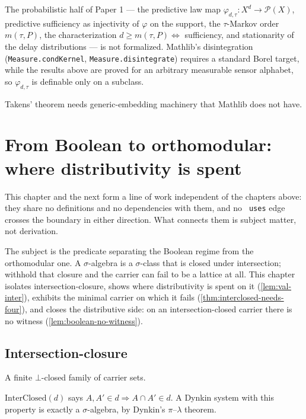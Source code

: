 The probabilistic half of Paper 1 --- the predictive law map
$\varphi_{d,\tau} : X^d \to \mathcal{P}(X)$, predictive sufficiency as
injectivity of $\varphi$ on the support, the $\tau$-Markov order $m(\tau,P)$,
the characterization $d \geq m(\tau,P) \iff$ sufficiency, and stationarity of
the delay distributions --- is not formalized. Mathlib's disintegration
(\texttt{Measure.condKernel}, \texttt{Measure.disintegrate}) requires a standard
Borel target, while the results above are proved for an arbitrary measurable
sensor alphabet, so $\varphi_{d,\tau}$ is definable only on a subclass.

Takens' theorem needs generic-embedding machinery that Mathlib does not have.
\chapter{From Boolean to orthomodular: where distributivity is spent}

This chapter and the next form a line of work independent of the chapters
above: they share no definitions and no dependencies with them, and no
\texttt{ uses} edge crosses the boundary in either direction. What
connects them is subject matter, not derivation.

The subject is the predicate separating the Boolean regime from the
orthomodular one. A $\sigma$-algebra is a $\sigma$-class that is closed under
intersection; withhold that closure and the carrier can fail to be a lattice at
all. This chapter isolates intersection-closure, shows where distributivity is
spent on it (\ref{lem:val-inter}), exhibits the minimal carrier on which it
fails (\ref{thm:interclosed-needs-four}), and closes the distributive side:
on an intersection-closed carrier there is no witness
(\ref{lem:boolean-no-witness}).

\section{Intersection-closure}

\begin{definition}[Block]
  \label{def:se-block}
  \leanok
  A finite $\bot$-closed family of carrier sets.
\end{definition}

\begin{definition}
  \label{def:interclosed}
  \leanok
  $\mathrm{InterClosed}(d)$ says $A, A' \in d \Rightarrow A \cap A' \in d$. A
  Dynkin system with this property is exactly a $\sigma$-algebra, by Dynkin's
  $\pi$--$\lambda$ theorem.
\end{definition}

